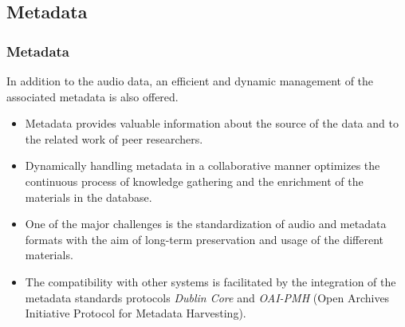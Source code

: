 \documentclass[final, hyperref, table]{beamer}
\begin{document}
\subsection{Metadata}\label{sec:metadata}
\begin{frame}\frametitle{Metadata}
  \begin{block}{}
    In addition to the audio data, an efficient and dynamic management
    of the associated metadata is also offered.
    \begin{itemize}
    \item Metadata provides valuable information about the
      \alert{source of the data} and to the related \alert{work of
        peer researchers}.
    \item Dynamically handling metadata in a \alert{collaborative}
      manner optimizes the continuous process of knowledge gathering
      and the \alert{enrichment} of the materials in the database.
    \item One of the major challenges is the \alert{standardization}
      of audio and metadata formats with the aim of long-term
      preservation and usage of the different materials.
    \item The compatibility with other systems is facilitated by the
      integration of the \alert{metadata standards protocols}
      \emph{Dublin Core} and \emph{OAI-PMH} (Open Archives Initiative
      Protocol for Metadata Harvesting).
    \end{itemize}
  \end{block}
\end{frame}
\end{document}
